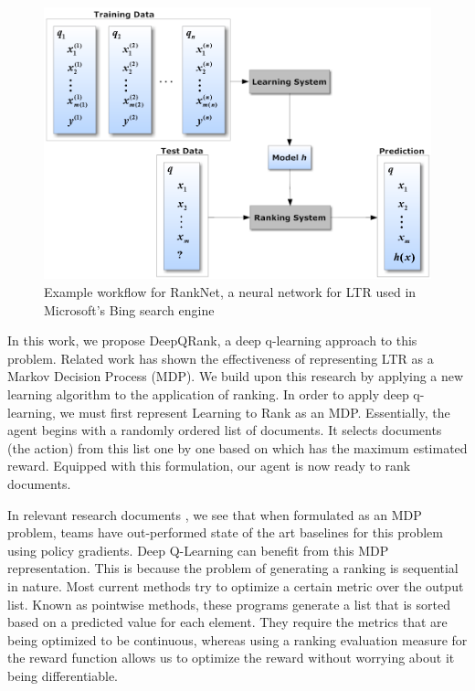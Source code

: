 \documentclass{article}
\begin{document}
\begin{figure}[h]
        \centering
        \includegraphics[scale=0.25]{ranknet.png}
        \caption{Example workflow for RankNet, a neural network for LTR used in Microsoft's Bing search engine}
        \label{fig:my_label}
\end{figure}

In this work, we propose DeepQRank, a deep q-learning approach to this problem. Related work has shown the effectiveness of representing LTR as a Markov Decision Process (MDP). We build upon this research by applying a new learning algorithm to the application of ranking. In order to apply deep q-learning, we must first represent Learning to Rank as an MDP. Essentially, the agent begins with a randomly ordered list of documents. It selects documents (the action) from this list one by one based on which has the maximum estimated reward. Equipped with this formulation, our agent is now ready to rank documents.

In relevant research documents \cite{source1}, we see that when formulated as an MDP problem, teams have out-performed state of the art baselines for this problem using policy gradients. Deep Q-Learning can benefit from this MDP representation. This is because the problem of generating a ranking is sequential in nature. Most current methods try to optimize a certain metric over the output list. Known as pointwise methods, these programs generate a list that is sorted based on a predicted value for each element. They require the metrics that are being optimized to be continuous, whereas using a ranking evaluation measure for the reward function allows us to optimize the reward without worrying about it being differentiable. 
\end{document}

